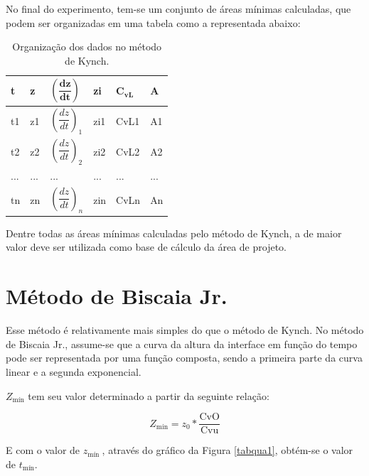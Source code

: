 No final do experimento, tem-se um conjunto de áreas mínimas calculadas, que podem ser organizadas em uma tabela como a representada abaixo:

	

\begin{table}[H]
	\centering
	\begin{tabular}{|l|l|l|l|l|l|}
		\hline
		\textbf{t} & \textbf{z} & $ \mathbf{\left( \dfrac{d z}{dt}  \right)} $ & \textbf{zi} & $ \mathbf{C_{vL}} $ & \textbf{A} \\ \hline
		t1 & z1 & $ \left ( \dfrac{d z}{dt}\right )_{1} $ & zi1 & CvL1 & A1 \\ \hline
		t2 & z2 & $ \left ( \dfrac{d z}{dt} \right )_{2} $ & zi2 & CvL2 & A2 \\ \hline
		... & ... & ... & ... & ... & ... \\ \hline
		tn & zn & $ \left ( \dfrac{d z}{dt}\right )_{n} $ & zin & CvLn & An \\ \hline
	\end{tabular}
	\caption{Organização dos dados no método de Kynch.}
	\label{kynch}
\end{table}


Dentre todas as áreas mínimas calculadas pelo método de Kynch, a de maior valor deve ser utilizada como base de cálculo da área de projeto.


\section{Método de Biscaia Jr.}

Esse método é relativamente mais simples do que o método de Kynch. No método de Biscaia Jr., assume-se que a curva da altura da interface em função do tempo pode ser representada por uma função composta, sendo a primeira parte da curva linear e a segunda exponencial. 

$ Z_{\text{mín}} $ tem seu valor determinado a partir da seguinte relação:

\begin{equation}\label{key}
Z_{\min }=z_{0} * \frac{\mathrm{CvO}}{\mathrm{Cvu}}
\end{equation}

E com o valor de $ z_{\text{mín }}$, através do gráfico da Figura \ref{tabqua1}, obtém-se o valor de $ t_{\text{mín}} $.

